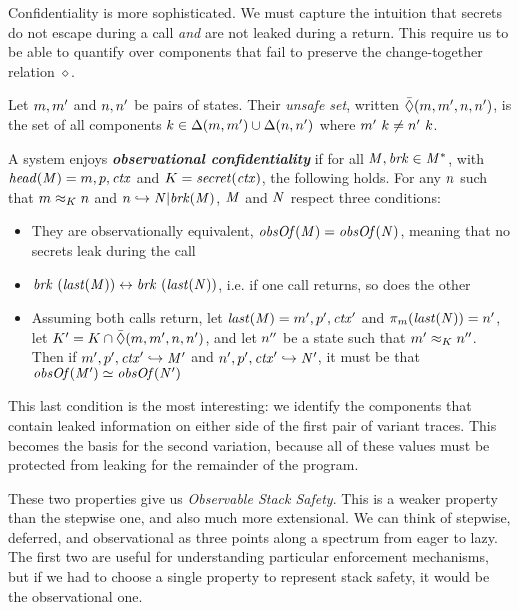 \documentclass[acmsmall,review,anonymous]{acmart}\settopmatter{printfolios=true,printccs=false,printacmref=false}
\begin{document}
{\medskip

Confidentiality is more sophisticated. We must capture the intuition that
secrets do not escape during a call {\em and} are not leaked during a return.
This require us to be able to quantify over components that fail to preserve
the change-together relation \(\diamond\).

 Let \(m,m'\) and \(n,n'\)
be pairs of states. Their {\em unsafe set}, written
\(\bar{\Diamond}(m,m',n,n')\), is the set of all components
\(k \in \Delta(m,m') \cup \Delta(n,n')\) where
\(m' ~ k \not = n' ~ k\).

A system enjoys \textbf{\em observational confidentiality} if for all
\(\mathit{M},\mathit{brk} \in \mathit{M}^*\), with \(\mathit{head}(\mathit{M}) = m,p,\mathit{ctx}\) and
\(K = \mathit{secret}(\mathit{ctx})\), the following holds.
%
For any \(n\) such that \(m \approx_K n\) and
\(n \hookrightarrow \mathit{N} | \mathit{brk}(\mathit{M})\),
\(\mathit{M}\) and \(\mathit{N}\) respect three conditions:

\begin{itemize}
\item They are observationally equivalent, \(\mathit{obsOf}(\mathit{M}) = \mathit{obsOf}(\mathit{N})\),
  meaning that no secrets leak during the call
\item \(\mathit{brk} ~ (\mathit{last}(\mathit{M})) \leftrightarrow \mathit{brk} ~
(\mathit{last}(\mathit{N}))\), i.e. if one call returns, so does the other
\item Assuming both calls return, let \(\mathit{last}(\mathit{M}) = m',p',\mathit{ctx}'\)
  and \(\pi_m(\mathit{last}(\mathit{N})) = n'\),
  let \(K' = K \cap \bar{\Diamond}(m,m',n,n')\),
  and let \(n''\) be a state such that \(m' \approx_K n''\).
  Then if \(m',p',\mathit{ctx}' \hookrightarrow \mathit{M}'\) and
  \(n',p',\mathit{ctx}' \hookrightarrow \mathit{N}'\), it must be
  that \(\mathit{obsOf}(\mathit{M}') \simeq \mathit{obsOf}(\mathit{N}')\)
\end{itemize}

This last condition is the most interesting: we identify the components that
contain leaked information on either side of the first pair of variant traces.
This becomes the basis for the second variation, because all of these values
must be protected from leaking for the remainder of the program.

These two properties give us
{\em Observable Stack Safety}. This is a weaker property
than the stepwise one, and also much more extensional.
We can think of stepwise, deferred, and observational as
three points along a spectrum from eager to lazy. The first two
are useful for understanding particular enforcement mechanisms,
but if we had to choose a single property to represent stack safety,
it would be the observational one.

}
\end{document}
